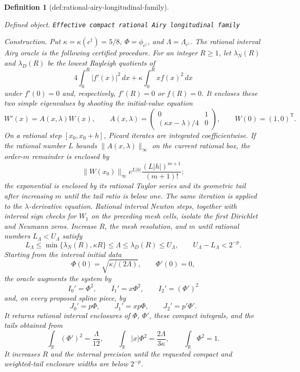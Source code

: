 \documentclass{article}
\newtheorem{definition}{Definition}
\begin{document}
\begin{definition}[def:rational-airy-longitudinal-family]\label{def:rational-airy-longitudinal-family}
\par\smallskip\noindent\emph{Defined object.} \texttt{Effective compact rational Airy longitudinal family}
\par\smallskip\noindent\emph{Construction.} Put \(\kappa=\kappa(c^\dagger)=5/8\), \(\Phi=\phi_{c^\dagger}\), and \(\Lambda=\Lambda_{c^\dagger}\).  The rational interval Airy oracle is the following certified procedure.  For an integer \(R\ge1\), let \(\lambda_N(R)\) and \(\lambda_D(R)\) be the lowest Rayleigh quotients of
\[
4\int_0^R|f'(x)|^2\,dx+\kappa\int_0^R x f(x)^2\,dx
\]
under \(f'(0)=0\) and, respectively, \(f'(R)=0\) or \(f(R)=0\).  It encloses these two simple eigenvalues by shooting the initial-value equation
\[
W'(x)=A(x,\lambda)W(x),\qquad
A(x,\lambda)=
\begin{pmatrix}0&1\\(\kappa x-\lambda)/4&0\end{pmatrix},\qquad
W(0)=(1,0)^{\mathsf T}.
\]
On a rational step \([x_0,x_0+h]\), Picard iterates are integrated coefficientwise.  If the rational number \(L\) bounds \(\|A(x,\lambda)\|_\infty\) on the current rational box, the order-\(m\) remainder is enclosed by
\[
\|W(x_0)\|_\infty e^{L|h|}
\frac{(L|h|)^{m+1}}{(m+1)!};
\]
the exponential is enclosed by its rational Taylor series and its geometric tail after increasing \(m\) until the tail ratio is below one.  The same iteration is applied to the \(\lambda\)-derivative equation.  Rational interval Newton steps, together with interval sign checks for \(W_1\) on the preceding mesh cells, isolate the first Dirichlet and Neumann zeros.  Increase \(R\), the mesh resolution, and \(m\) until rational numbers \(L_\Lambda<U_\Lambda\) satisfy
\[
L_\Lambda\le \min\{\lambda_N(R),\kappa R\}
\le\Lambda\le\lambda_D(R)\le U_\Lambda,
\qquad U_\Lambda-L_\Lambda<2^{-p}.
\]
Starting from the interval initial data
\[
\Phi(0)=\sqrt{\kappa/(2\Lambda)},\qquad \Phi'(0)=0,
\]
the oracle augments the system by
\[
I_0'=\Phi^2,\qquad I_1'=x\Phi^2,\qquad I_2'=(\Phi')^2
\]
and, on every proposed spline piece, by
\[
J_0'=p\Phi,\qquad J_1'=xp\Phi,\qquad J_2'=p'\Phi'.
\]
It returns rational interval enclosures of \(\Phi\), \(\Phi'\), these compact integrals, and the tails obtained from
\[
\int_{\mathbb R}(\Phi')^2=\frac{\Lambda}{12},\qquad
\int_{\mathbb R}|x|\Phi^2=\frac{2\Lambda}{3\kappa},\qquad
\int_{\mathbb R}\Phi^2=1.
\]
It increases \(R\) and the internal precision until the requested compact and weighted-tail enclosure widths are below \(2^{-p}\).


\end{definition}
\end{document}
